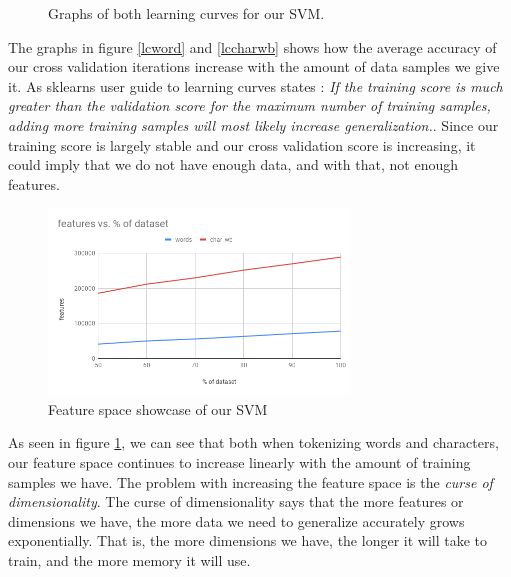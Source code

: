 \begin{figure}[H]
	\centering
	\caption{Graphs of both learning curves for our SVM.}
\end{figure}

The graphs in figure \ref{lcword} and \ref{lccharwb} shows how the average accuracy of our cross validation iterations increase with the amount of data samples we give it. As sklearns user guide to learning curves states \cite{learningcurve}: \textit{If the training score is much greater than the validation score for the maximum number of training samples, adding more training samples will most likely increase generalization.}.
Since our training score is largely stable and our cross validation score is increasing, it could imply that we do not have enough data, and with that, not enough features.

\begin{figure}[H]
    \includegraphics[width=8cm]{Images/DatasetFeatures}
    \centering
    \caption{Feature space showcase of our SVM}
    \label{featspace}
\end{figure}
As seen in figure \ref{featspace}, we can see that both when tokenizing words and characters, our feature space continues to increase linearly with the amount of training samples we have. The problem with increasing the feature space is the \textit{curse of dimensionality}. The curse of dimensionality says that the more features or dimensions we have, the more data we need to generalize accurately grows exponentially. That is, the more dimensions we have, the longer it will take to train, and the more memory it will use.

